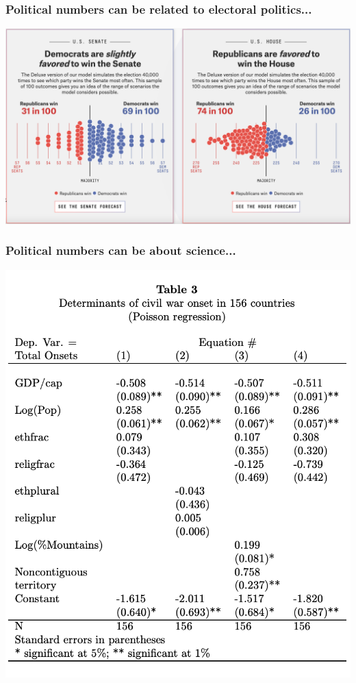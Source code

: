 \documentclass[aspectratio=169]{beamer}
\theoremstyle{principle}
\begin{document}
\begin{frame}
\frametitle{Political numbers can be related to electoral politics...}
\begin{center}
\includegraphics[scale=0.3]{538.png}
\end{center}

\end{frame}

\begin{frame}
\frametitle{Political numbers can be about science...}
\begin{center}
\includegraphics[scale=0.45]{f_and_l.png}
\end{center}

\end{frame}
\end{document}

